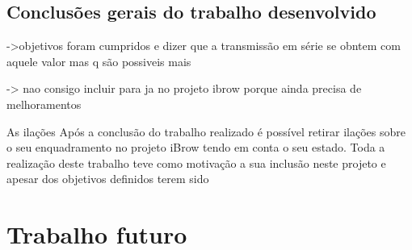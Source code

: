\subsection*{Conclusões gerais do trabalho desenvolvido}




->objetivos foram cumpridos e dizer que a transmissão em série se obntem com aquele valor mas q são possiveis mais 

-> nao consigo incluir para ja no projeto ibrow porque ainda precisa de melhoramentos

As ilações 
Após a conclusão do trabalho realizado é possível retirar ilações sobre o seu enquadramento no projeto iBrow tendo em conta o seu estado. Toda a realização deste trabalho teve como motivação a sua inclusão neste projeto e apesar dos objetivos definidos terem sido

\section{Trabalho futuro}


%
%
%
